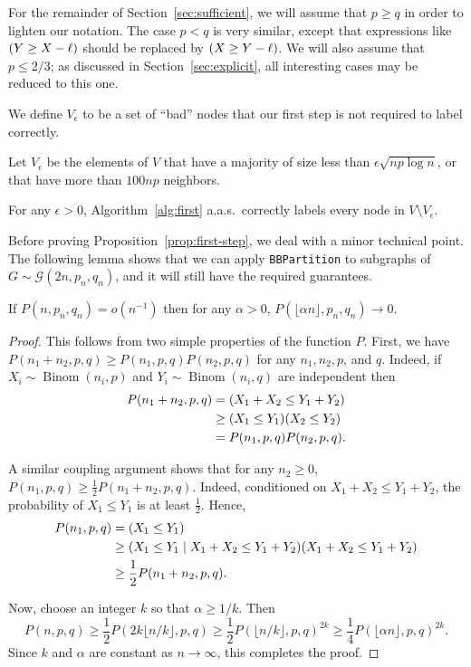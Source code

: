 \documentclass[EJP,final]{ejpecp}
\newcommand{\1}[1]{\mathbbm{1}_{\{#1\}}}
\newcommand{\calG}{\mathcal{G}}
\let\Pr\relax
\DeclareMathOperator{\Pr}{Pr}
\DeclareMathOperator{\Binom}{Binom}
\begin{document}
For the remainder of Section~\ref{sec:sufficient}, we will assume
that $p \ge q$ in order to lighten our notation. The case $p < q$
is very similar, except that expressions like $\Pr(Y \ge X - \ell)$ should
be replaced by $\Pr(X \ge Y - \ell)$. We will also assume that $p \le 2/3$;
as discussed in Section~\ref{sec:explicit}, all interesting cases may be
reduced to this one.

We define $V_\epsilon$ to be a set of ``bad'' nodes
that our first step is not required to label correctly.
\begin{definition}
 Let $V_\epsilon$ be the elements of $V$ that have a majority of
 size less than $\epsilon \sqrt{n p \log n}$, or that have more than
 $100np$ neighbors.
\end{definition}


\begin{proposition}\label{prop:first-step}
  For any $\epsilon > 0$,
 Algorithm~\ref{alg:first} a.a.s.\ correctly labels every node
 in $V \setminus V_\epsilon$.
\end{proposition}

Before proving Proposition~\ref{prop:first-step}, we deal with a minor
technical point.
The following lemma shows that we can apply {\tt BBPartition} to subgraphs
of $G \sim \calG(2n, p_n, q_n)$, and it will still have the required guarantees.

\begin{lemma}
 If $P(n, p_n, q_n) = o(n^{-1})$ then for any $\alpha > 0$,
 $P(\lfloor \alpha n \rfloor, p_n, q_n) \to 0$.
\end{lemma}

\begin{proof}
This follows from two simple properties of the function $P$.
First, we have $P(n_1 + n_2, p, q) \ge P(n_1, p, q) P(n_2, p, q)$ for
any $n_1, n_2, p$, and $q$. Indeed, if $X_i \sim \Binom(n_i, p)$
and $Y_i \sim \Binom(n_i, q)$ are independent then
\begin{align*}
 P(n_1 + n_2, p, q)
 &= \Pr(X_1 + X_2 \le Y_1 + Y_2) \\
 &\ge \Pr(X_1 \le Y_1) \Pr(X_2 \le Y_2) \\
 &= P(n_1, p, q) P(n_2, p, q).
\end{align*}

A similar coupling argument shows that for any $n_2 \ge 0$,
$P(n_1, p, q) \ge \frac 12 P(n_1 + n_2, p, q)$. Indeed, conditioned on
$X_1 + X_2 \le Y_1 + Y_2$, the probability of $X_1 \le Y_1$ is at least $\frac 12$.
Hence,
\begin{align*}
P(n_1, p, q)
&= \Pr(X_1 \le Y_1) \\
&\ge \Pr(X_1 \le Y_1 \mid X_1 + X_2 \le Y_1 + Y_2) \Pr(X_1 + X_2 \le Y_1 + Y_2) \\
&\ge \frac 12 P(n_1 + n_2, p, q).
\end{align*}

Now, choose an integer $k$ so that $\alpha \ge 1/k$. Then
\[
 P(n, p, q) \ge \frac 12 P(2k \lfloor n/k\rfloor, p, q)
 \ge \frac 12 P(\lfloor n/k \rfloor, p, q)^{2k}
 \ge \frac 14 P(\lfloor \alpha n \rfloor, p, q)^{2k}.
\]
Since $k$ and $\alpha$ are constant as $n \to \infty$, this completes the proof.
\end{proof}
\end{document}
